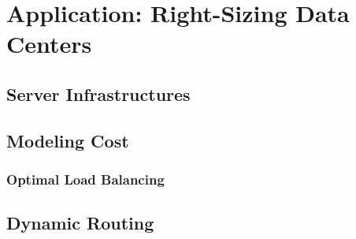
\chapter{Application: Right-Sizing Data Centers}\label{chapter:application}

\section{Server Infrastructures}

\section{Modeling Cost}

\subsection{Optimal Load Balancing}

\section{Dynamic Routing}
